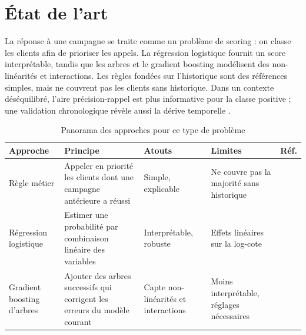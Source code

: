 \documentclass[11pt,a4paper]{article}
\begin{document}
\section{État de l'art}
\label{sec:etat}
La réponse à une campagne se traite comme un problème de scoring : on classe les clients afin de prioriser les appels. La régression logistique fournit un score interprétable, tandis que les arbres et le gradient boosting modélisent des non-linéarités et interactions. Les règles fondées sur l'historique sont des références simples, mais ne couvrent pas les clients sans historique. Dans un contexte déséquilibré, l'aire précision-rappel est plus informative pour la classe positive ; une validation chronologique révèle aussi la dérive temporelle \cite{etat1}.

\begin{table}[htbp]
  \centering
  \caption{Panorama des approches pour ce type de problème}
  \label{tab:etat}
  \small
  \begin{tabular}{@{}P{3cm} P{4.3cm} P{3.5cm} P{3.5cm} l@{}}
    \toprule
    Approche & Principe & Atouts & Limites & Réf. \\
    \midrule
    Règle métier & Appeler en priorité les clients dont une campagne antérieure a réussi & Simple, explicable & Ne couvre pas la majorité sans historique & \cite{etat1} \\
    Régression logistique & Estimer une probabilité par combinaison linéaire des variables & Interprétable, robuste & Effets linéaires sur la log-cote & \cite{etat1} \\
    Gradient boosting d'arbres & Ajouter des arbres successifs qui corrigent les erreurs du modèle courant & Capte non-linéarités et interactions & Moins interprétable, réglages nécessaires & \cite{etat1} \\
    \bottomrule
  \end{tabular}
\end{table}

\end{document}
